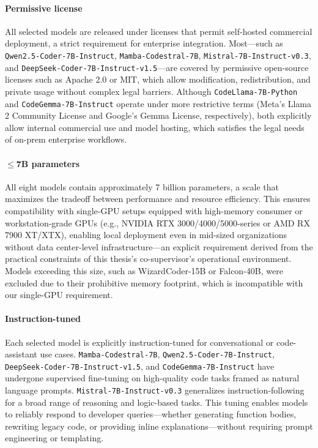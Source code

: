\paragraph{Permissive license}
All selected models are released under licenses that permit self-hosted commercial deployment, a strict requirement for enterprise integration. Most---such as \texttt{Qwen2.5-Coder-7B-Instruct}, \texttt{Mamba-Codestral-7B}, \texttt{Mistral-7B-Instruct-v0.3}, and \texttt{DeepSeek-Coder-7B-Instruct-v1.5}---are covered by permissive open-source licenses such as Apache 2.0 or MIT, which allow modification, redistribution, and private usage without complex legal barriers. Although \texttt{CodeLlama-7B-Python} and \texttt{CodeGemma-7B-Instruct} operate under more restrictive terms (Meta’s Llama 2 Community License and Google’s Gemma License, respectively), both explicitly allow internal commercial use and model hosting, which satisfies the legal needs of on-prem enterprise workflows.

\paragraph{\(\leq\)7B parameters}
All eight models contain approximately 7 billion parameters, a scale that maximizes the tradeoff between performance and resource efficiency. This ensures compatibility with single-GPU setups equipped with high-memory consumer or workstation-grade GPUs (e.g., NVIDIA RTX 3000/4000/5000-series or AMD RX 7900 XT/XTX), enabling local deployment even in mid-sized organizations without data center-level infrastructure---an explicit requirement derived from the practical constraints of this thesis's co-supervisor’s operational environment. Models exceeding this size, such as WizardCoder-15B or Falcon-40B, were excluded due to their prohibitive memory footprint, which is incompatible with our single-GPU requirement.

\paragraph{Instruction-tuned}
Each selected model is explicitly instruction-tuned for conversational or code-assistant use cases. \texttt{Mamba-Codestral-7B}, \texttt{Qwen2.5-Coder-7B-Instruct}, \texttt{DeepSeek-Coder-7B-Instruct-v1.5}, and \texttt{CodeGemma-7B-Instruct} have undergone supervised fine-tuning on high-quality code tasks framed as natural language prompts. \texttt{Mistral-7B-Instruct-v0.3} generalizes instruction-following for a broad range of reasoning and logic-based tasks. This tuning enables models to reliably respond to developer queries---whether generating function bodies, rewriting legacy code, or providing inline explanations---without requiring prompt engineering or templating.

